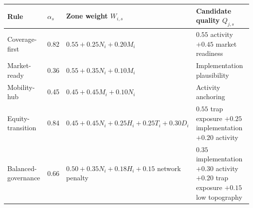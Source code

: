 \begin{tabularx}{\textwidth}{p{}p{}X X}
\toprule
Rule & $\alpha_s$ & Zone weight $W_{i,s}$ & Candidate quality $Q_{j,s}$ \\
\midrule
Coverage-first & 0.82 & $0.55+0.25N_i+0.20M_i$ & $0.55$ activity $+0.45$ market readiness \\
Market-ready & 0.36 & $0.55+0.35N_i+0.10M_i$ & Implementation plausibility \\
Mobility-hub & 0.45 & $0.45+0.45M_i+0.10N_i$ & Activity anchoring \\
Equity-transition & 0.84 & $0.45+0.45N_i+0.25H_i+0.25T_i+0.30D_i$ & $0.55$ trap exposure $+0.25$ implementation $+0.20$ activity \\
Balanced-governance & 0.66 & $0.50+0.35N_i+0.18H_i+0.15$ network penalty & $0.35$ implementation $+0.30$ activity $+0.20$ trap exposure $+0.15$ low topography \\
\bottomrule
\end{tabularx}
